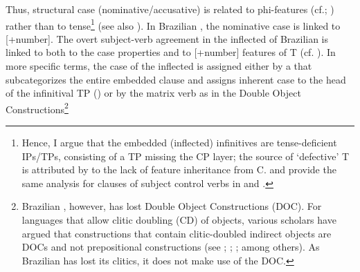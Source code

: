 \documentclass[output=paper]{langsci/langscibook}
\begin{document}
Thus, structural case (nominative\slash accusative) is related to phi-features (cf.\linebreak\citealt{George1981}; \citealt{Sitaridou2006}) rather than to tense\footnote{Hence, I argue that the embedded (inflected) infinitives are tense-deficient IPs\slash TPs, consisting of a TP missing the CP layer; the source of ‘defective’ T is attributed by \citet{Chomsky2008} to the lack of feature inheritance from C. \citet{Alboiu2007} and \citet{Alexiadou2010} provide the same analysis for  clauses of subject control verbs in  and .} (see also \citealt{Pires2007}). In Brazilian , the nominative case is linked to [+number]. The overt subject-verb agreement in the inflected  of Brazilian  is linked to both to the case properties and to [+number] features of T (cf. \citealt{Nunes1998}). In more specific terms, the case of the inflected  is assigned either by a  that subcategorizes the entire embedded clause and assigns inherent case to the head of the infinitival TP (\citealt{Hornstein2008}) or by the matrix verb as in the Double Object Constructions\footnote{Brazilian , however, has lost Double Object Constructions (DOC). For languages that allow clitic doubling (CD) of objects, various scholars have argued that constructions that contain clitic-doubled indirect objects are DOCs and not prepositional constructions (see \citealt{Demonte1995}; \citealt{Bleam1999}; \citealt{Anagnostopoulou2003}; among others). As Brazilian  has lost its clitics, it does not make use of the DOC. 

}
\end{document}
